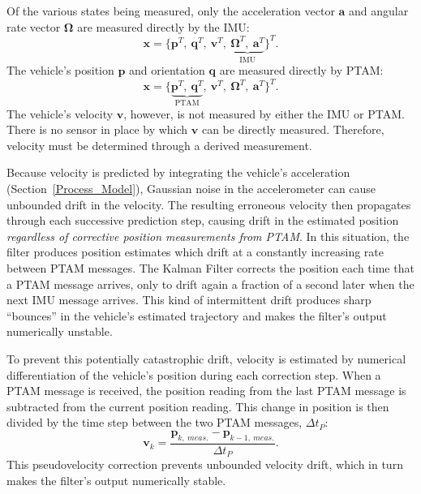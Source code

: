 Of the various states being measured, only the acceleration vector $\mathbf{a}$ and angular rate vector $\bm{\Omega}$ are measured directly by the IMU:
%
\begin{equation*}
\mathbf{x} = 
\Big\{   
    \mathbf{p}^{T},\
    \mathbf{q}^{T},\
    \mathbf{v}^{T},\
    \underbrace{
    \bm{\Omega}^{T},\
    \mathbf{a}^{T}}_{\text{IMU}}
\Big\} ^{T}.
\end{equation*}
%
The vehicle's position $\mathbf{p}$ and orientation $\mathbf{q}$ are measured directly by PTAM:
%
\begin{equation*}
\mathbf{x} = 
\Big\{
\underbrace{
    \mathbf{p}^{T},\
    \mathbf{q}^{T}}_{\text{PTAM}},\
    \mathbf{v}^{T},\
    \bm{\Omega}^{T},\
    \mathbf{a}^{T}
\Big\} ^{T}.
\end{equation*}
%
The vehicle's velocity $\mathbf{v}$, however, is not measured by either the IMU or PTAM. There is no sensor in place by which $\mathbf{v}$ can be directly measured. Therefore, velocity must be determined through a derived measurement.

Because velocity is predicted by integrating the vehicle's acceleration (Section~\ref{Process_Model}), Gaussian noise in the accelerometer can cause unbounded drift in the velocity. The resulting erroneous velocity then propagates through each successive prediction step, causing drift in the estimated position \textit{regardless of corrective position measurements from PTAM}. In this situation, the filter produces position estimates which drift at a constantly increasing rate between PTAM messages. The Kalman Filter corrects the position each time that a PTAM message arrives, only to drift again a fraction of a second later when the next IMU message arrives. This kind of intermittent drift produces sharp ``bounces'' in the vehicle's estimated trajectory and makes the filter's output numerically unstable.

To prevent this potentially catastrophic drift, velocity is estimated by numerical differentiation of the vehicle's position during each correction step. When a PTAM message is received, the position reading from the last PTAM message is subtracted from the current position reading. This change in position is then divided by the time step between the two PTAM messages, $\Delta t_{P}$:
%
\begin{equation}
\mathbf{v}_{k} = \frac{\mathbf{p}_{k,\ meas.} - \mathbf{p}_{k-1,\ meas.}}{\Delta t_{P}} .
\end{equation}
%
This pseudovelocity correction prevents unbounded velocity drift, which in turn makes the filter's output numerically stable.

